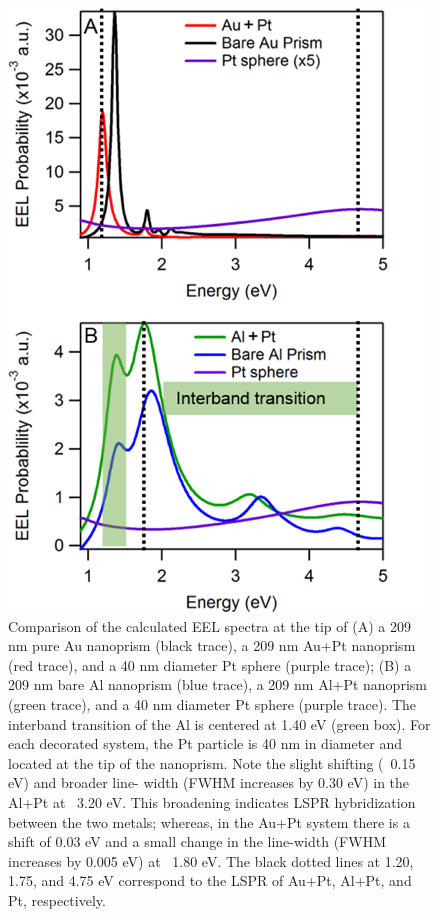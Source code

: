 \documentclass [11pt, proquest] {uwthesis}[2016/11/22]
\begin{document}
\begin{figure}
\includegraphics{prisms_EELS_simulation.png}
\caption{Comparison of the calculated EEL spectra at the tip of (A) a 209 nm pure Au nanoprism (black trace), a 209 nm Au+Pt nanoprism (red trace), and a 40 nm diameter Pt sphere (purple trace); (B) a 209 nm bare Al nanoprism (blue trace), a 209 nm Al+Pt nanoprism (green trace), and a 40 nm diameter Pt sphere (purple trace). The interband transition of the Al is centered at 1.40 eV (green box). For each decorated system, the Pt particle is 40 nm in diameter and located at the tip of the nanoprism. Note the slight shifting (~0.15 eV) and broader line- width (FWHM increases by 0.30 eV) in the Al+Pt at ~3.20 eV. This broadening indicates LSPR hybridization between the two metals; whereas, in the Au+Pt system there is a shift of 0.03 eV and a small change in the line-width (FWHM increases by 0.005 eV) at ~1.80 eV. The black dotted lines at 1.20, 1.75, and 4.75 eV correspond to the LSPR of Au+Pt, Al+Pt, and Pt, respectively.}
\label{prisms_EELS_sim}
\end{figure}
\end{document}
